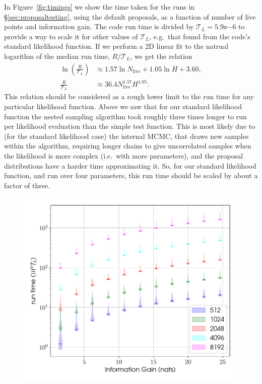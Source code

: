 In Figure~\ref{fig:timings} we show the time taken for the runs in \S\ref{sec:proposaltesting},
using the default proposals, as a function of number of live points and information gain. The code run time is divided by $\mathcal{T}_{L}= 5.9\ee{-6}$ to
provide a way to scale it for other values of $\mathcal{T}_{L}$, e.g.\ that found from the code's standard likelihood function. If we perform a 2D linear
fit to the natrual logarithm of the median run time, $R/\mathcal{T}_L$, we get the relation
\begin{align}\label{eq:runtime}
 \ln{\left(\frac{R}{\mathcal{T}_L}\right)} &\approx 1.57 \ln{N_{\text{live}}} + 1.05 \ln{H} + 3.60, \\
 \frac{R}{\mathcal{T}_L} &\approx 36.4 N_{\text{live}}^{1.57} H^{1.05}.
\end{align}
This relation should be considered as a rough lower limit to the run time for any particular likelihood function. Above we saw that for our standard likelihood
function the nested sampling algorithm took roughly three times longer to run per likelihood evaluation than the simple test function. This is most likely due
to (for the standard likelihood case) the internal MCMC, that draws new samples within the algorithm, requiring longer chains to give uncorrelated samples when
the likelihood is more complex (i.e.\ with more parameters), and the proposal distributions have a harder time approximating it. So, for our standard likelihood
function, and run over four parameters, this run time should be scaled by about a factor of three.

\begin{figure}[!phtb]
\begin{center}
\includegraphics[width=1\columnwidth]{./figures/proptesting/walk_uniform_prop/timing/collate_plots_wup_timings}
\caption{ \protect}
\end{center}
\end{figure}
